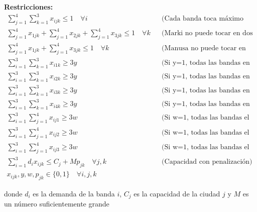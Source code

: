\documentclass[12pt]{article}
\begin{document}
\textbf{Restricciones:}
\begin{align*}
    \sum_{j=1}^{4} \sum_{k=1}^{3} x_{ijk} \leq 1 \quad \forall i && \text{(Cada banda toca máximo una vez)} \\
    \sum_{j=1}^{4} x_{1jk} + \sum_{j=1}^{4} x_{2jk} + \sum_{j=1}^{4} x_{3jk} \leq 1 \quad \forall k && \text{(Marki no puede tocar en dos ciudades diferentes el mismo día)} \\
    \sum_{j=1}^{4} x_{1jk} + \sum_{j=1}^{4} x_{3jk} \leq 1 \quad \forall k && \text{(Manusa no puede tocar en dos ciudades diferentes el mismo día)} \\
    \sum_{i=1}^{3} \sum_{k=1}^{3} x_{i1k} \geq 3y && \text{(Si y=1, todas las bandas en Buenos Aires)} \\
    \sum_{i=1}^{3} \sum_{k=1}^{3} x_{i2k} \geq 3y && \text{(Si y=1, todas las bandas en Córdoba)} \\
    \sum_{i=1}^{3} \sum_{k=1}^{3} x_{i3k} \geq 3y && \text{(Si y=1, todas las bandas en Rosario)} \\
    \sum_{i=1}^{3} \sum_{k=1}^{3} x_{i4k} \geq 3y && \text{(Si y=1, todas las bandas en Mendoza)} \\
    \sum_{i=1}^{3} \sum_{j=1}^{4} x_{ij1} \geq 3w && \text{(Si w=1, todas las bandas el viernes)} \\
    \sum_{i=1}^{3} \sum_{j=1}^{4} x_{ij2} \geq 3w && \text{(Si w=1, todas las bandas el sábado)} \\
    \sum_{i=1}^{3} \sum_{j=1}^{4} x_{ij3} \geq 3w && \text{(Si w=1, todas las bandas el domingo)} \\
    \sum_{i=1}^{3} d_i x_{ijk} \leq C_j + M p_{jk} \quad \forall j,k && \text{(Capacidad con penalización)} \\
    x_{ijk}, y, w, p_{jk} \in \{0,1\} \quad \forall i,j,k
\end{align*}
\begin{center}
donde $d_i$ es la demanda de la banda $i$, $C_j$ es la capacidad de la ciudad $j$ y $M$ es un número suficientemente grande
\end{center}
\end{document}
